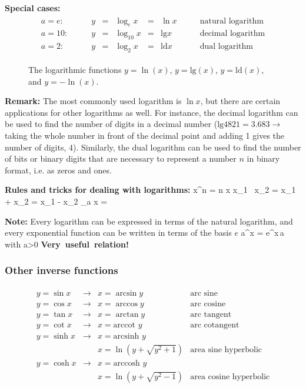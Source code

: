 {\bf Special cases:}
\begin{eqnarray*}
\begin{array}{lcccccc}
a=e: \qquad & y & = & \log_e x & = & \ln x & \qquad\mbox{natural logarithm}\\
a=10: \qquad & y & = & \log_{10} x & = & \mbox{lg} x & \qquad\mbox{decimal logarithm}\\
a=2: \qquad  & y & = & \log_2 x & = & \mbox{ld} x & \qquad\mbox{dual logarithm}
\end{array}
\end{eqnarray*}

\begin{figure}[!h]
    \centerline{\epsfxsize=10cm  } \svs
   \caption{The logarithmic functions $y=\ln(x)$, $y=\mbox{lg}(x)$, $y=\mbox{ld}(x)$, and $y=-\ln(x)$.} \label{fig15}
\end{figure} \vs

{\bf Remark:} The most commonly used logarithm is $\ln x$, but there are certain applications for other 
logarithms as well. For instance, the decimal logarithm can be used to find the number of digits in 
a decimal number 
($\mbox{lg} 4821=3.683 \rightarrow$  taking the whole number in front of the decimal point and 
adding 1 gives the number of digits, 4). Similarly, the dual logarithm can be used to find the number
of bits or binary digits that are necessary to represent a number $n$ in binary format, i.e. as 
zeros and ones.  

{\bf Rules and tricks for dealing with logarithms:}
\bnn \ln x^n = n \ln x \enn
\bnn \ln x_1 \, x_2 = \ln x_1 + \ln x_2  \qquad  \ln {} = \ln x_1 - \ln x_2  \enn
\bnn \log_a x =  \enn

{\bf Note:} Every logarithm can be expressed in terms of the natural logarithm, and every exponential 
function can be written in terms of the basis $e$
\bnn    a^x = e^{x\,\ln a} \quad \mbox{with} \quad a>0 \qquad \mbox{\bf Very useful relation!} \enn 

\subsubsection{Other inverse functions}
\vspace*{-0.9cm} \begin{eqnarray*} \begin{array}{llll}
y=\sin x & \rightarrow & x = \arcsin y & \mbox{arc sine} \\
y=\cos x & \rightarrow & x = \arccos y & \mbox{arc cosine} \\
y=\tan x & \rightarrow & x = \arctan y & \mbox{arc tangent} \\
y=\cot x & \rightarrow & x = \mbox{arccot } y & \mbox{arc cotangent} \\
y=\sinh x & \rightarrow & x = \mbox{arcsinh } y & \\
& & x=\ln(y+\sqrt{y^2+1})
& \mbox{area sine hyperbolic} \\
y=\cosh x & \rightarrow & x = \mbox{arccosh } y & \\
& & x = \ln(y+\sqrt{y^2-1})
& \mbox{area cosine hyperbolic}
\end{array} \end{eqnarray*} \svs

